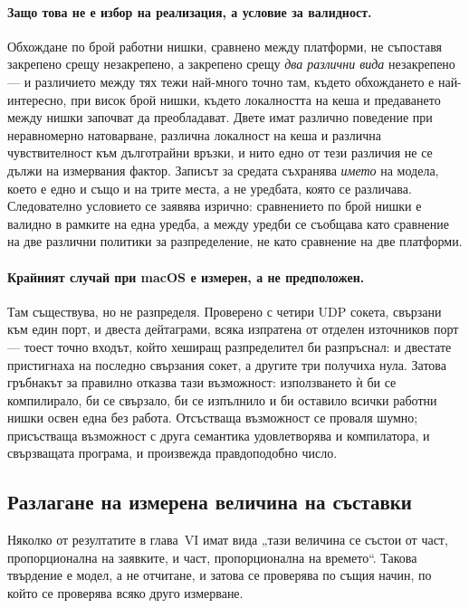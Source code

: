 \paragraph{Защо това не е избор на реализация, а условие за валидност.} Обхождане по брой работни
нишки, сравнено между платформи, не съпоставя закрепено срещу незакрепено, а закрепено срещу
\emph{два различни вида} незакрепено — и различието между тях тежи най-много точно там, където
обхождането е най-интересно, при висок брой нишки, където локалността на кеша и предаването между
нишки започват да преобладават. Двете имат
различно поведение при неравномерно натоварване, различна локалност на кеша и различна чувствителност
към дълготрайни връзки, и нито едно от тези различия не се дължи на измервания фактор. Записът за
средата съхранява \emph{името} на модела, което е едно и също и на трите места, а не уредбата, която
се различава. Следователно условието се заявява изрично: сравнението по брой нишки е валидно в
рамките на една уредба, а между уредби се съобщава като сравнение на две различни политики за
разпределение, не като сравнение на две платформи.

\paragraph{Крайният случай при macOS е измерен, а не предположен.} Там 
съществува, но не разпределя. Проверено с четири UDP сокета, свързани към един порт, и двеста
дейтаграми, всяка изпратена от отделен източников порт — тоест точно входът, който хеширащ
разпределител би разпръснал: и двестате пристигнаха на последно свързания сокет, а другите три
получиха нула.
Затова гръбнакът за  правилно отказва тази възможност: използването ѝ би се компилирало,
би се свързало, би се изпълнило и би оставило всички работни нишки освен една без работа. Отсъстваща
възможност се проваля шумно; присъстваща възможност с друга семантика удовлетворява и компилатора, и
свързващата програма, и произвежда правдоподобно число.

\subsection{Разлагане на измерена величина на съставки}

Няколко от резултатите в глава~VI имат вида „тази величина се състои от част, пропорционална
на заявките, и част, пропорционална на времето“. Такова твърдение е модел, а не отчитане, и
затова се проверява по същия начин, по който се проверява всяко друго измерване.

